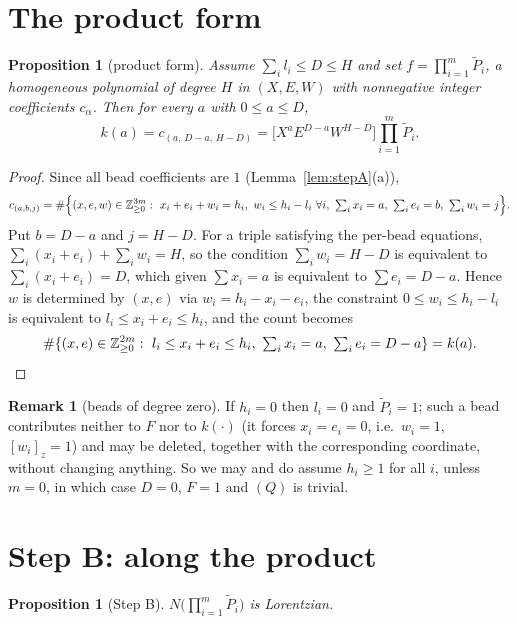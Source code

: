 \documentclass[11pt]{article}
\theoremstyle{plain}
\newtheorem{proposition}[theorem]{Proposition}
\theoremstyle{definition}
\newtheorem{remark}[theorem]{Remark}
\newcommand{\Z}{\mathbb{Z}}
\newcommand{\Pt}{\widetilde P}
\begin{document}
\section{The product form}

\begin{proposition}[product form]\label{prop:prod}
Assume $\sum_il_i\le D\le H$ and set $f=\prod_{i=1}^m\Pt_i$, a homogeneous polynomial of
degree $H$ in $(X,E,W)$ with nonnegative integer coefficients $c_\alpha$. Then for every
$a$ with $0\le a\le D$,
\[
  k(a)=c_{(a,\,D-a,\,H-D)}=\bigl[X^aE^{D-a}W^{H-D}\bigr]\prod_{i=1}^m\Pt_i .
\]
\end{proposition}

\begin{proof}
Since all bead coefficients are $1$ (Lemma~\ref{lem:stepA}(a)),
\[
  c_{(a,b,j)}=\#\Bigl\{(x,e,w)\in\Z_{\ge0}^{3m}:\ x_i+e_i+w_i=h_i,\ w_i\le h_i-l_i\ \forall i,\
  \textstyle\sum_ix_i=a,\ \sum_ie_i=b,\ \sum_iw_i=j\Bigr\}.
\]
Put $b=D-a$ and $j=H-D$. For a triple satisfying the per-bead equations,
$\sum_i(x_i+e_i)+\sum_iw_i=H$, so the condition $\sum_iw_i=H-D$ is equivalent to
$\sum_i(x_i+e_i)=D$, which given $\sum x_i=a$ is equivalent to $\sum e_i=D-a$. Hence $w$ is
determined by $(x,e)$ via $w_i=h_i-x_i-e_i$, the constraint $0\le w_i\le h_i-l_i$ is
equivalent to $l_i\le x_i+e_i\le h_i$, and the count becomes
\[
  \#\{(x,e)\in\Z_{\ge0}^{2m}:\ l_i\le x_i+e_i\le h_i,\ \textstyle\sum_ix_i=a,\ \sum_ie_i=D-a\}=k(a).\qedhere
\]
\end{proof}

\begin{remark}[beads of degree zero]\label{rem:deg0}
If $h_i=0$ then $l_i=0$ and $\Pt_i=1$; such a bead contributes neither to $F$ nor to
$k(\cdot)$ (it forces $x_i=e_i=0$, i.e.\ $w_i=1$, $[w_i]_z=1$) and may be deleted, together
with the corresponding coordinate, without changing anything. So we may and do assume
$h_i\ge1$ for all $i$, unless $m=0$, in which case $D=0$, $F=1$ and $(Q)$ is trivial.
\end{remark}

\section{Step B: along the product}\label{sec:stepB}

\begin{proposition}[Step B]\label{prop:stepB}
$N\bigl(\prod_{i=1}^m\Pt_i\bigr)$ is Lorentzian.
\end{proposition}
\end{document}
